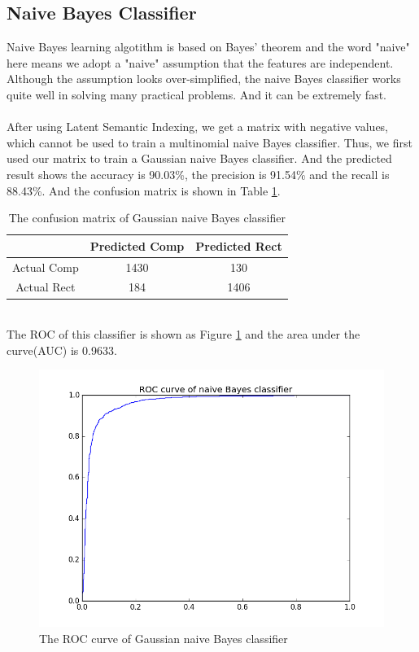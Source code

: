 \documentclass{article}
\begin{document}
\subsection{Naive Bayes Classifier}
Naive Bayes learning algotithm is based on Bayes' theorem and the word "naive" here means we adopt a "naive" assumption that the features are independent. Although the assumption looks over-simplified, the naive Bayes classifier works quite well in solving many practical problems. And it can be extremely fast.\\
\\
After using Latent Semantic Indexing, we get a matrix with negative values, which cannot be used to train a multinomial naive Bayes classifier. Thus, we first used our matrix to train a Gaussian naive Bayes classifier. And the predicted result shows the accuracy is 90.03\%, the precision is 91.54\% and the recall is 88.43\%. And the confusion matrix is shown in Table \ref{tb:confu_gnb}.\\
\begin{table}
\begin{center}
\caption{The confusion matrix of Gaussian naive Bayes classifier}
\label{tb:confu_gnb}
\begin{tabular}{|c|c|c|}
\hline
& Predicted Comp& Predicted Rect\\
\hline
Actual Comp&1430&130\\
\hline
Actual Rect&184&1406\\
\hline
\end{tabular}
\end{center}
\end{table}
\\
The ROC of this classifier is shown as Figure \ref{fig:roc_gnb} and the area under the curve(AUC) is 0.9633.\\
\begin{figure}[htbp]
\centering
\includegraphics[width=.6\textwidth]{g_gaus_naive_bayes_roc.png}
\caption{The ROC curve of Gaussian naive Bayes classifier}
\label{fig:roc_gnb}
\end{figure}
\end{document}
